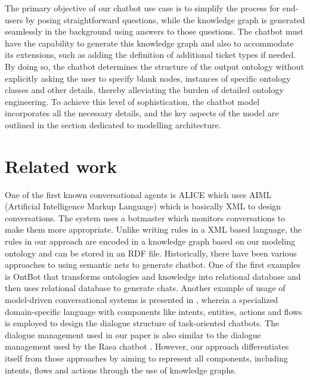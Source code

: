 \documentclass[runningheads]{llncs}
\begin{document}
The primary objective of our chatbot use case is to simplify the process for end-users by posing straightforward questions, while the knowledge graph is generated seamlessly in the background using answers to those questions. The chatbot must have the capability to generate this knowledge graph and also to accommodate its extensions, such as adding the definition of additional ticket types if needed. By doing so, the chatbot determines the structure of the output ontology without explicitly asking the user to specify blank nodes, instances of specific ontology classes and other details, thereby alleviating the burden of detailed ontology engineering. To achieve this level of sophistication, the chatbot model incorporates all the necessary details, and the key aspects of the model are outlined in the section dedicated to modelling architecture.
\section{Related work}
One of the first known conversational agents is ALICE \cite{wallace2009anatomy} which uses AIML (Artificial Intelligence Markup Language) which is basically XML to design conversations. The system uses a botmaster which monitors conversations to make them more appropriate. Unlike writing rules in a XML based language, the rules in our approach are encoded in a knowledge graph based on our modeling ontology and can be stored in an RDF file. Historically, there have been various approaches to using semantic nets to generate chatbot. One of the first examples is OntBot \cite{al2011ontbot} that transforms ontologies and knowledge into relational database and then uses relational database to generate chats. Another example of usage of model-driven conversational systems is presented in \cite{perez2020model}, wherein a specialized domain-specific language with components like intents, entities, actions and flows is employed to design the dialogue structure of task-oriented chatbots. The dialogue management used in our paper is also similar to the dialogue management used by the Rasa chatbot \cite{bocklisch2017rasa}. However, our approach differentiates itself from those approaches by aiming to represent all components, including intents, flows and actions through the use of knowledge graphs. 
\end{document}
